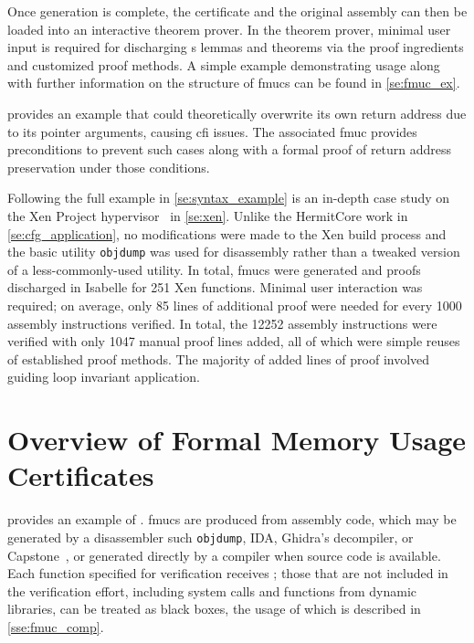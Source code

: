 
Once generation is complete, the certificate and the original assembly%
can then be loaded into an interactive theorem prover.
In the theorem prover,
minimal user input is required for discharging s lemmas and theorems
via the proof ingredients and customized proof methods.%
%
A simple example demonstrating usage along with 
further information on the structure of \acp{fmuc} can be found in \cref{se:fmuc_ex}.

 provides an example that could theoretically overwrite
its own return address due to its pointer arguments, causing \ac{cfi} issues.
The associated \ac{fmuc} provides preconditions to prevent such cases%
along with a formal proof of return address preservation under those conditions.

Following the full example in \cref{se:syntax_example} is an in-depth case study
on the Xen Project hypervisor~\citep{chisnall2008definitive} in \cref{se:xen}.
Unlike the HermitCore work in \cref{se:cfg_application},
no modifications were made to the Xen build process
and the basic utility \texttt{objdump} was used for disassembly
rather than a tweaked version of a less-commonly-used utility.
In total, \acp{fmuc} were generated and proofs discharged in Isabelle
for 251 Xen functions.
Minimal user interaction was required;
on average, only \num{85} lines of additional proof were needed
for every \num{1000} assembly instructions verified.
In total, the \num{12252} assembly instructions
were verified with only \num{1047} manual proof lines added,
all of which were simple reuses of established proof methods.
The majority of added lines of proof involved guiding loop invariant application.

\section{Overview of Formal Memory Usage Certificates}\label{se:fmuc_overview}
 provides an example of .
\Acp{fmuc} are produced from assembly code,
which may be generated by a disassembler such \texttt{objdump},
IDA,
Ghidra's decompiler, or Capstone~\citep{capstone},
or generated directly by a compiler when source code is available.
Each function specified for verification receives ;
those that are not included in the verification effort,%
including system calls and functions from dynamic libraries,
can be treated as black boxes,
the usage of which is described in \cref{sse:fmuc_comp}.


